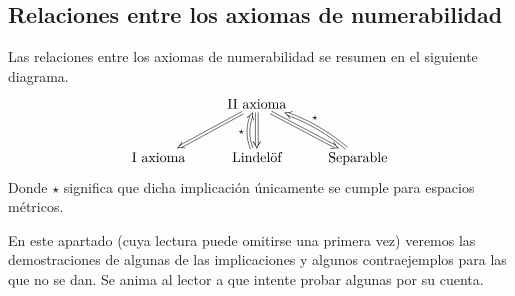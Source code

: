 \subsection{Relaciones entre los axiomas de numerabilidad}
Las relaciones entre los axiomas de numerabilidad se resumen en el siguiente diagrama.
\begin{equation*}
	\xymatrix{
		& \text{II axioma}\ar@{=>}[dl]\ar@{=>}[d]\ar@{=>}[dr]&\\
		\text{I axioma} & \text{Lindelöf}\ar@{=>}@/^/[u]^{\star} & \text{Separable}\ar@{=>}@/_/[ul]_{\star}
	}
\end{equation*}
Donde $\star$ significa que dicha implicación únicamente se cumple para espacios métricos.

En este apartado (cuya lectura puede omitirse una primera vez) veremos las demostraciones de algunas de las implicaciones y algunos contraejemplos para las que no se dan. Se anima al lector a que intente probar algunas por su cuenta.

